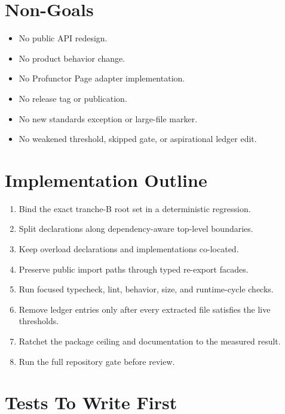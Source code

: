 \section{Non-Goals}\label{record-246-non-goals}

\begin{itemize}
\tightlist
\item
  No public API redesign.
\item
  No product behavior change.
\item
  No Profunctor Page adapter implementation.
\item
  No release tag or publication.
\item
  No new standards exception or large-file marker.
\item
  No weakened threshold, skipped gate, or aspirational ledger edit.
\end{itemize}

\section{Implementation Outline}\label{record-246-implementation-outline}

\begin{enumerate}
\def\labelenumi{\arabic{enumi}.}
\tightlist
\item
  Bind the exact tranche-B root set in a deterministic regression.
\item
  Split declarations along dependency-aware top-level boundaries.
\item
  Keep overload declarations and implementations co-located.
\item
  Preserve public import paths through typed re-export facades.
\item
  Run focused typecheck, lint, behavior, size, and runtime-cycle checks.
\item
  Remove ledger entries only after every extracted file satisfies the live thresholds.
\item
  Ratchet the package ceiling and documentation to the measured result.
\item
  Run the full repository gate before review.
\end{enumerate}

\section{Tests To Write First}\label{record-246-tests-to-write-first}

